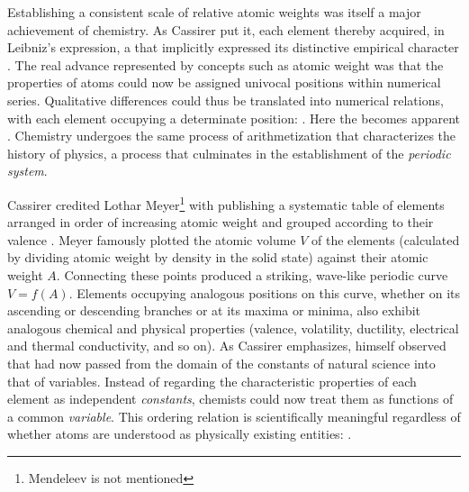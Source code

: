 \documentclass[submitted,12pt]{article}
\begin{document}
Establishing a consistent scale of relative atomic weights was itself a major achievement of chemistry. As Cassirer put it, each element thereby acquired, in Leibniz’s expression, a  that implicitly expressed its distinctive empirical character . The real advance represented by concepts such as atomic weight was that the properties of atoms could now be assigned univocal positions within numerical series. Qualitative differences could thus be translated into numerical relations, with each element occupying a determinate position:  . Here the   becomes apparent . Chemistry undergoes the same process of arithmetization that characterizes the history of physics, a process that culminates in the establishment of the \emph{periodic system}.



Cassirer credited Lothar Meyer\footnote{Mendeleev is not mentioned} with publishing a systematic table of elements arranged in order of increasing atomic weight and grouped according to their valence \citep[see, e.g.][]{Arnesano2025}. Meyer famously plotted the atomic volume $V$ of the elements (calculated by dividing atomic weight by density in the solid state) against their atomic weight $A$. Connecting these points produced a striking, wave-like periodic curve $V=f(A)$. Elements occupying analogous positions on this curve, whether on its ascending or descending branches or at its maxima or minima, also exhibit analogous chemical and physical properties (valence, volatility, ductility, electrical and thermal conductivity, and so on). As Cassirer emphasizes, \citet[176]{Meyer1884} himself observed that  had now passed from the domain of the constants of natural science into that of variables. Instead of regarding the characteristic properties of each element as independent \emph{constants}, chemists could now treat them as functions of a common \emph{variable}. This ordering relation is scientifically meaningful regardless of whether atoms are understood as physically existing entities:  .
\end{document}
